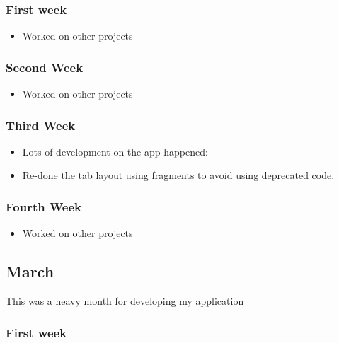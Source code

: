 \subsubsection*{First week}\label{first-week-4}

\begin{itemize}
\tightlist
\item
  Worked on other projects
\end{itemize}

\subsubsection*{Second Week}\label{second-week-4}

\begin{itemize}
\tightlist
\item
  Worked on other projects
\end{itemize}

\subsubsection*{Third Week}\label{third-week-3}

\begin{itemize}
\tightlist
\item
  Lots of development on the app happened:
\item
  Re-done the tab layout using fragments to avoid using deprecated code.
\end{itemize}

\subsubsection*{Fourth Week}\label{fourth-week-3}

\begin{itemize}
\tightlist
\item
  Worked on other projects
\end{itemize}

\subsection{March}\label{march}

This was a heavy month for developing my application

\subsubsection*{First week}\label{first-week-5}

